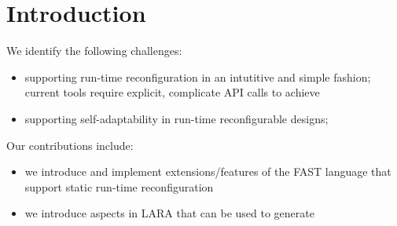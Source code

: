 \section{Introduction}
We identify the following challenges:
\begin{itemize}
\item supporting run-time reconfiguration in an intutitive and simple
  fashion; current tools require explicit, complicate API calls to achieve
\item supporting self-adaptability in run-time reconfigurable designs;
\end{itemize}

Our contributions include:
\begin{itemize}
\item we introduce and implement extensions/features of the FAST
  language that support static run-time reconfiguration
\item we introduce aspects in LARA that can be used to generate
\end{itemize}
